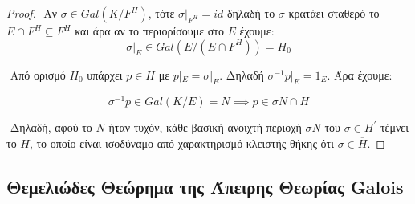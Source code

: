 \documentclass[oneside,a4paper]{article}
\newcommand {\tl}{\textlatin}
\begin{document}
\begin{proof}
$ $\newline
\noindent Αν $\sigma \in Gal(K/F^H)$, τότε $\sigma|_{F^H} = id$ δηλαδή το $\sigma$ κρατάει σταθερό το $E \cap F^H \subseteq F^H$ και άρα αν το περιορίσουμε στο $E$ έχουμε:
$$\sigma|_E \in Gal(E/ (E\cap F^H)) = H_0$$

$ $\newline
\noindent Από ορισμό $H_0$ υπάρχει $p \in H$ με $p|_E = \sigma|_E$. Δηλαδή $\sigma^{-1} p|_E = 1_E$.
Άρα έχουμε:

$$\sigma^{-1} p \in Gal(K/E) = N \implies p \in \sigma N \cap H$$

$ $\newline
\noindent Δηλαδή, αφού το $N$ ήταν τυχόν, κάθε βασική ανοιχτή περιοχή $\sigma N$ του $\sigma \in H^{\prime}$  τέμνει το $H$, το οποίο είναι ισοδύναμο από χαρακτηρισμό κλειστής θήκης ότι $\sigma \in \overline H$.

\end{proof}

\subsection{Θεμελιώδες Θεώρημα της Άπειρης Θεωρίας \tl{Galois}}
\vspace{0.3truecm}
\end{document}
